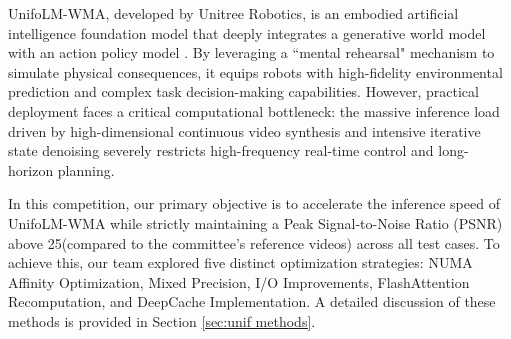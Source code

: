 UnifoLM-WMA, developed by Unitree Robotics, is an embodied artificial intelligence foundation model that deeply integrates a generative world model with an action policy model \cite{unifolm-wma-0}.
By leveraging a ``mental rehearsal" mechanism to simulate physical consequences, it equips robots with high-fidelity environmental prediction and complex task decision-making capabilities. 
However, practical deployment faces a critical computational bottleneck: the massive inference load driven by high-dimensional continuous video synthesis and intensive iterative state denoising severely restricts high-frequency real-time control and long-horizon planning.

In this competition, our primary objective is to accelerate the inference speed of UnifoLM-WMA while strictly maintaining a Peak Signal-to-Noise Ratio (PSNR) above 25(compared to the committee's reference videos) across all test cases.
To achieve this, our team explored five distinct optimization strategies: NUMA Affinity Optimization, Mixed Precision, I/O Improvements, FlashAttention Recomputation, and DeepCache Implementation. 
A detailed discussion of these methods is provided in Section \ref{sec:unif methods}.



